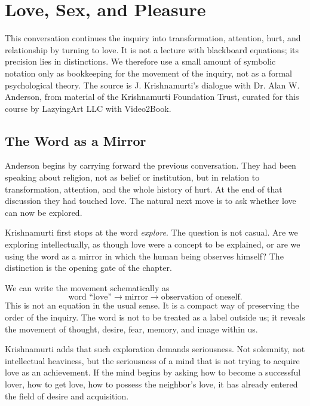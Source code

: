 \chapter{Love, Sex, and Pleasure}

This conversation continues the inquiry into transformation, attention, hurt, and relationship by turning to love. It is not a lecture with blackboard equations; its precision lies in distinctions. We therefore use a small amount of symbolic notation only as bookkeeping for the movement of the inquiry, not as a formal psychological theory. The source is J. Krishnamurti's dialogue with Dr. Alan W. Anderson, from material of the Krishnamurti Foundation Trust, curated for this course by LazyingArt LLC with Video2Book.

\section{The Word as a Mirror}

Anderson begins by carrying forward the previous conversation. They had been speaking about religion, not as belief or institution, but in relation to transformation, attention, and the whole history of hurt. At the end of that discussion they had touched love. The natural next move is to ask whether love can now be explored.

Krishnamurti first stops at the word \emph{explore}. The question is not casual. Are we exploring intellectually, as though love were a concept to be explained, or are we using the word as a mirror in which the human being observes himself? The distinction is the opening gate of the chapter.

We can write the movement schematically as
\begin{equation}
\text{word ``love''} \longrightarrow \text{mirror} \longrightarrow \text{observation of oneself}.
\end{equation}
This is not an equation in the usual sense. It is a compact way of preserving the order of the inquiry. The word is not to be treated as a label outside us; it reveals the movement of thought, desire, fear, memory, and image within us.

Krishnamurti adds that such exploration demands seriousness. Not solemnity, not intellectual heaviness, but the seriousness of a mind that is not trying to acquire love as an achievement. If the mind begins by asking how to become a successful lover, how to get love, how to possess the neighbor's love, it has already entered the field of desire and acquisition.

